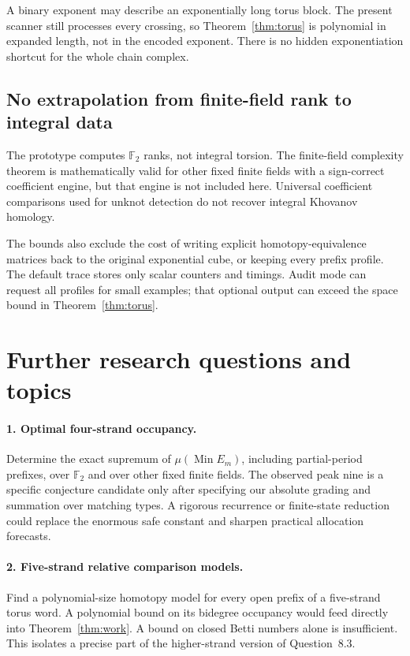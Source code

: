 \documentclass[11pt,letterpaper]{article}
\theoremstyle{remark}\newtheorem{remark}[theorem]{Remark}
\newcommand{\F}{\mathbb F}
\newcommand{\Min}{\operatorname{Min}}
\begin{document}
A binary exponent may describe an exponentially long torus block. The present scanner still processes every crossing, so Theorem~\ref{thm:torus} is polynomial in expanded length, not in the encoded exponent. There is no hidden exponentiation shortcut for the whole chain complex.

\subsection{No extrapolation from finite-field rank to integral data}
The prototype computes $\F_2$ ranks, not integral torsion. The finite-field complexity theorem is mathematically valid for other fixed finite fields with a sign-correct coefficient engine, but that engine is not included here. Universal coefficient comparisons used for unknot detection do not recover integral Khovanov homology.

The bounds also exclude the cost of writing explicit homotopy-equivalence matrices back to the original exponential cube, or keeping every prefix profile. The default trace stores only scalar counters and timings. Audit mode can request all profiles for small examples; that optional output can exceed the space bound in Theorem~\ref{thm:torus}.

\section{Further research questions and topics}\label{sec:future}
\paragraph{1. Optimal four-strand occupancy.}
Determine the exact supremum of $\mu(\Min E_m)$, including partial-period prefixes, over $\F_2$ and over other fixed finite fields. The observed peak nine is a specific conjecture candidate only after specifying our absolute grading and summation over matching types. A rigorous recurrence or finite-state reduction could replace the enormous safe constant and sharpen practical allocation forecasts.

\paragraph{2. Five-strand relative comparison models.}
Find a polynomial-size homotopy model for every open prefix of a five-strand torus word. A polynomial bound on its bidegree occupancy would feed directly into Theorem~\ref{thm:work}. A bound on closed Betti numbers alone is insufficient. This isolates a precise part of the higher-strand version of Question~8.3.
\end{document}

